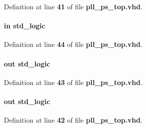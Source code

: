 Definition at line {\bf 41} of file {\bf pll\+\_\+ps\+\_\+top.\+vhd}.

\paragraph[{pll\+\_\+phasedone}]{ {\bfseries \textcolor{keywordflow}{in}\textcolor{vhdlchar}{ }} {\bfseries \textcolor{comment}{std\+\_\+logic}\textcolor{vhdlchar}{ }} \hspace{0.3cm}{\ttfamily [Port]}}\label{classpll__ps__top_af033f1b8e6d86c0fd0ff01551ba31f18}


Definition at line {\bf 44} of file {\bf pll\+\_\+ps\+\_\+top.\+vhd}.

\paragraph[{pll\+\_\+phasestep}]{ {\bfseries \textcolor{keywordflow}{out}\textcolor{vhdlchar}{ }} {\bfseries \textcolor{comment}{std\+\_\+logic}\textcolor{vhdlchar}{ }} \hspace{0.3cm}{\ttfamily [Port]}}\label{classpll__ps__top_af550a195bbb22d65df1e586e3a125d40}


Definition at line {\bf 43} of file {\bf pll\+\_\+ps\+\_\+top.\+vhd}.

\paragraph[{pll\+\_\+phaseupdown}]{ {\bfseries \textcolor{keywordflow}{out}\textcolor{vhdlchar}{ }} {\bfseries \textcolor{comment}{std\+\_\+logic}\textcolor{vhdlchar}{ }} \hspace{0.3cm}{\ttfamily [Port]}}\label{classpll__ps__top_a214826a04d6f05105456cd907573ef7d}


Definition at line {\bf 42} of file {\bf pll\+\_\+ps\+\_\+top.\+vhd}.

